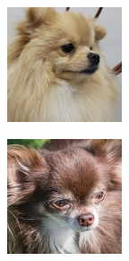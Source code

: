 \documentclass{report}
\begin{document}
\begin{figure}[h!]
\begin{subfigure}[t]{0.19\textwidth}
    \label{fig:dataset-sub3}
  \end{subfigure}
  \hfill
  \begin{subfigure}[t]{0.19\textwidth}
    \centering
    \includegraphics[width=\textwidth]{dataset/dog_3.jpg}
    \label{fig:dataset-sub4}
  \end{subfigure}
  \hfill
  \begin{subfigure}[t]{0.19\textwidth}
    \centering
    \includegraphics[width=\textwidth]{dataset/dog_4.jpg}
    \label{fig:dataset-sub5}
  \end{subfigure}


\end{figure}
\end{document}
